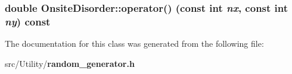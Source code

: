 \subsubsection{\setlength{\rightskip}{0pt plus 5cm}double Onsite\-Disorder::operator() (const int {\em nx}, const int {\em ny}) const\hspace{0.3cm}{\tt  [inline]}}\label{classOnsiteDisorder_a0d64a34664af1e060c2a01797721a70}




The documentation for this class was generated from the following file:\begin{CompactItemize}
\item 
src/Utility/\bf{random\_\-generator.h}\end{CompactItemize}
